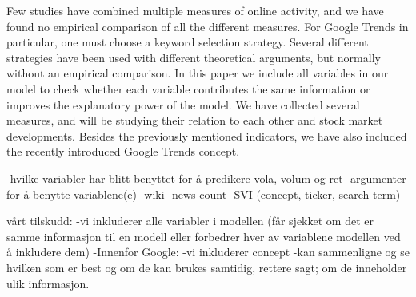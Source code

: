 Few studies have combined multiple measures of online activity, and we have found no empirical comparison of all the different measures. For Google Trends in particular, one must choose a keyword selection strategy. Several different strategies have been used with different theoretical arguments, but normally without an empirical comparison. In this paper we include all variables in our model to check whether each variable contributes the same information or improves the explanatory power of the model. We have collected several measures, and will be studying their relation to each other and stock market developments. Besides the previously mentioned indicators, we have also included the recently introduced Google Trends concept. 
\cleardoublepage

-hvilke variabler har blitt benyttet for å predikere vola, volum og ret
-argumenter for å benytte variablene(e)
	-wiki
    -news count
	-SVI (concept, ticker, search term)

vårt tilskudd:
-vi inkluderer alle variabler i modellen (får sjekket om det er samme informasjon til en modell eller forbedrer hver av variablene modellen ved å inkludere dem)
-Innenfor Google: 
	-vi inkluderer concept
	-kan sammenligne og se hvilken som er best og om de kan brukes
    samtidig, rettere sagt; om de inneholder ulik informasjon. 

 
